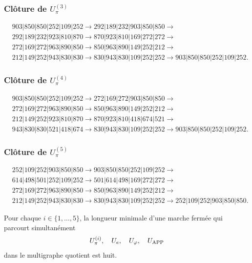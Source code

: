 \subsubsection{Clôture de \texorpdfstring{\(U_\pi^{(3)}\)}{U-pi 3}}
\begin{align*}
&903|850|850|252|109|252\to
292|189|232|903|850|850\to\\
&292|189|232|923|810|870\to
870|923|810|169|272|272\to\\
&272|169|272|963|890|850\to
850|963|890|149|252|212\to\\
&212|149|252|943|830|830\to
830|943|830|109|252|252\to
903|850|850|252|109|252.
\end{align*}

\subsubsection{Clôture de \texorpdfstring{\(U_\pi^{(4)}\)}{U-pi 4}}
\begin{align*}
&903|850|850|252|109|252\to
272|169|272|903|850|850\to\\
&272|169|272|963|890|850\to
850|963|890|149|252|212\to\\
&212|149|252|923|810|870\to
870|923|810|418|674|521\to\\
&943|830|830|521|418|674\to
830|943|830|109|252|252\to
903|850|850|252|109|252.
\end{align*}

\subsubsection{Clôture de \texorpdfstring{\(U_\pi^{(5)}\)}{U-pi 5}}
\begin{align*}
&252|109|252|903|850|850\to
903|850|850|252|109|252\to\\
&614|498|501|252|109|252\to
501|614|498|169|272|272\to\\
&272|169|272|963|890|850\to
850|963|890|149|252|212\to\\
&212|149|252|943|830|830\to
830|943|830|109|252|252\to
252|109|252|903|850|850.
\end{align*}

\begin{theorem}
\label{p12-83-c9-s1:thm:minimalidad-cierres-pi-autonoma}
Pour chaque \(i\in\{1,\ldots,5\}\), la longueur minimale d’une marche fermée
qui parcourt simultanément
\[
 U_\pi^{(i)},\quad U_e,\quad U_\varphi,\quad U_{\rm APP}
\]
dans le multigraphe quotient est huit.
\end{theorem}

